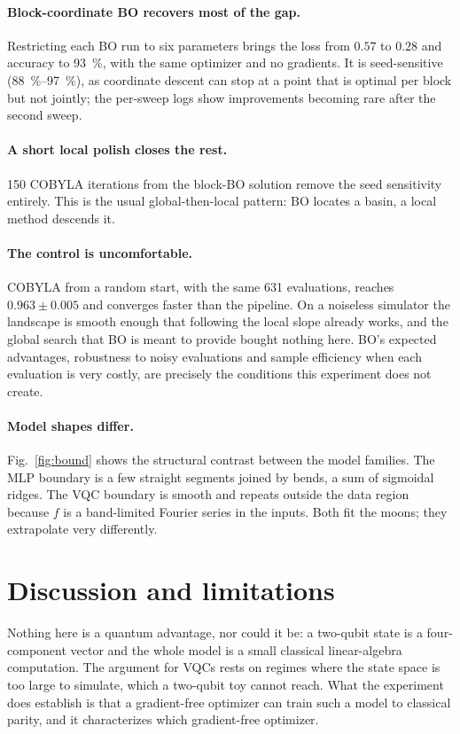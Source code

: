 \documentclass[10pt,twocolumn]{article}
\begin{document}
\paragraph{Block-coordinate BO recovers most of the gap.} Restricting each BO run to
six parameters brings the loss from $0.57$ to $0.28$ and accuracy to
\SI{93}{\percent}, with the same optimizer and no gradients. It is seed-sensitive
(\SIrange{88}{97}{\percent}), as coordinate descent can stop at a point that is
optimal per block but not jointly; the per-sweep logs show improvements becoming rare
after the second sweep.

\paragraph{A short local polish closes the rest.} 150 COBYLA iterations from the
block-BO solution remove the seed sensitivity entirely. This is the usual
global-then-local pattern: BO locates a basin, a local method descends it.

\paragraph{The control is uncomfortable.} COBYLA from a random start, with the same
631 evaluations, reaches $0.963\pm0.005$ and converges faster than the pipeline. On a
noiseless simulator the landscape is smooth enough that following the local slope
already works, and the global search that BO is meant to provide bought nothing
here. BO's expected advantages, robustness to noisy evaluations and sample
efficiency when each evaluation is very costly, are precisely the conditions this
experiment does not create.

\paragraph{Model shapes differ.} Fig.~\ref{fig:bound} shows the structural contrast
between the model families. The MLP boundary is a few straight segments joined by
bends, a sum of sigmoidal ridges. The VQC boundary is smooth and repeats outside the
data region because $f$ is a band-limited Fourier series in the inputs. Both fit the
moons; they extrapolate very differently.

\section{Discussion and limitations}

Nothing here is a quantum advantage, nor could it be: a two-qubit state is a
four-component vector and the whole model is a small classical linear-algebra
computation. The argument for VQCs rests on regimes where the state space is too
large to simulate, which a two-qubit toy cannot reach. What the experiment does
establish is that a gradient-free optimizer can train such a model to classical
parity, and it characterizes which gradient-free optimizer.
\end{document}
